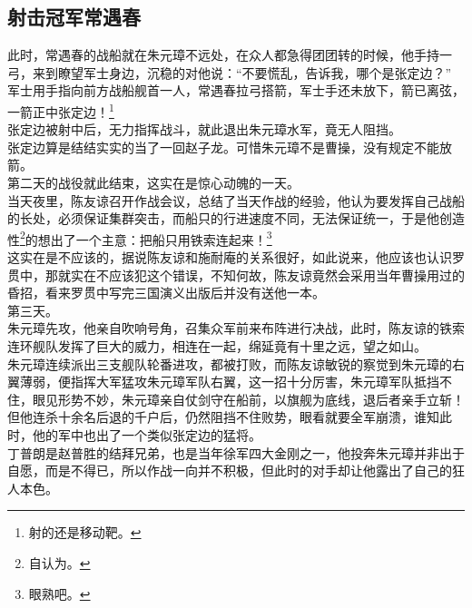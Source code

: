 \begin{multicols}{\theparacolNo}
\subsection{射击冠军常遇春}
此时，常遇春的战船就在朱元璋不远处，在众人都急得团团转的时候，他手持一弓，来到瞭望军士身边，沉稳的对他说：“不要慌乱，告诉我，哪个是张定边？”\\

军士用手指向前方战船舰首一人，常遇春拉弓搭箭，军士手还未放下，箭已离弦，一箭正中张定边！\footnote{射的还是移动靶。}\\

张定边被射中后，无力指挥战斗，就此退出朱元璋水军，竟无人阻挡。\\

张定边算是结结实实的当了一回赵子龙。可惜朱元璋不是曹操，没有规定不能放箭。\\

第二天的战役就此结束，这实在是惊心动魄的一天。\\

当天夜里，陈友谅召开作战会议，总结了当天作战的经验，他认为要发挥自己战船的长处，必须保证集群突击，而船只的行进速度不同，无法保证统一，于是他创造性\footnote{自认为。}的想出了一个主意：把船只用铁索连起来！\footnote{眼熟吧。}\\

这实在是不应该的，据说陈友谅和施耐庵的关系很好，如此说来，他应该也认识罗贯中，那就实在不应该犯这个错误，不知何故，陈友谅竟然会采用当年曹操用过的昏招，看来罗贯中写完三国演义出版后并没有送他一本。\\

第三天。\\

朱元璋先攻，他亲自吹响号角，召集众军前来布阵进行决战，此时，陈友谅的铁索连环舰队发挥了巨大的威力，相连在一起，绵延竟有十里之远，望之如山。\\

朱元璋连续派出三支舰队轮番进攻，都被打败，而陈友谅敏锐的察觉到朱元璋的右翼薄弱，便指挥大军猛攻朱元璋军队右翼，这一招十分厉害，朱元璋军队抵挡不住，眼见形势不妙，朱元璋亲自仗剑守在船前，以旗舰为底线，退后者亲手立斩！\\

但他连杀十余名后退的千户后，仍然阻挡不住败势，眼看就要全军崩溃，谁知此时，他的军中也出了一个类似张定边的猛将。\\

丁普朗是赵普胜的结拜兄弟，也是当年徐军四大金刚之一，他投奔朱元璋并非出于自愿，而是不得已，所以作战一向并不积极，但此时的对手却让他露出了自己的狂人本色。\\


\end{multicols}
